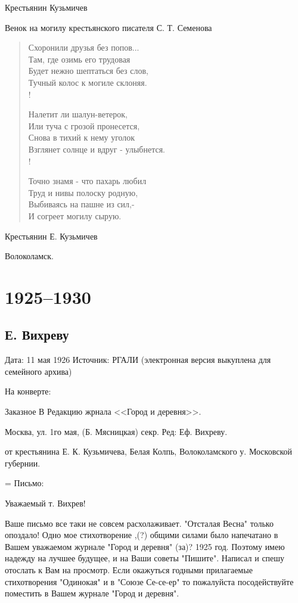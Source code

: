 \documentclass[]{memoir}
\begin{document}
Крестьянин Кузьмичев





Венок на могилу
крестьянского писателя
С. Т. Семенова     

\begin{verse}
Схоронили друзья без попов...\\
  Там, где озимь его трудовая\\
Будет нежно шептаться без слов,\\
  Тучный колос к могиле склоняя.\\!

Налетит ли шалун-ветерок,\\
  Или туча с грозой пронесется,\\
Снова в тихий к нему уголок\\
  Взглянет солнце и вдруг - улыбнется.\\!

Точно знамя - что пахарь любил\\
  Труд и нивы полоску родную,\\
Выбиваясь на пашне из сил,-\\
  И согреет могилу сырую.
\end{verse}
             

  Крестьянин Е. Кузьмичев
  
  Волоколамск.

\chapter{1925--1930}
  
\section{Е. Вихреву}
Дата: 11 мая 1926
Источник: РГАЛИ
(электронная версия выкуплена для семейного архива)

На конверте:

Заказное
В Редакцию жрнала <<Город и деревня>>.

Москва, ул. 1го мая,
(Б. Мясницкая)
секр. Ред: Еф. Вихреву.

от крестьянина Е. К. Кузьмичева,
Белая Колпь, Волоколамского у.
Московской губернии.


= Письмо:

Уважаемый т. Вихрев!

Ваше письмо все таки не совсем расхолаживает. "Отсталая Весна" только опоздало! Одно мое стихотворение ,(?) общими силами было напечатано в Вашем уважаемом журнале "Город и деревня" (за)? 1925 год. Поэтому имею надежду на лучшее будущее, и на Ваши советы "Пишите". Написал и спешу отослать к Вам на просмотр. Если окажуться годными прилагаемые стихотворения "Одинокая" и в "Союзе Се-се-ер" то пожалуйста посодействуйте поместить в Вашем журнале "Город и деревня".
\end{document}
